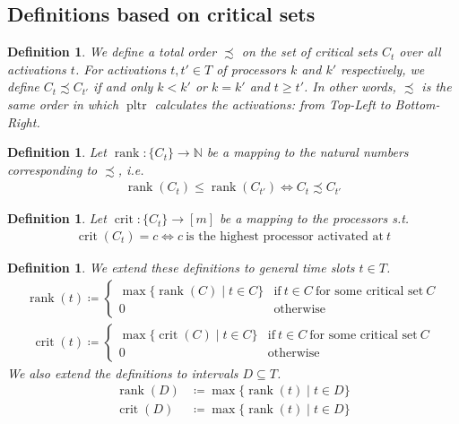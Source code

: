 \documentclass[a4paper]{article}
\DeclareMathOperator{\pltr}{pltr}
\DeclareMathOperator{\rank}{rank}
\DeclareMathOperator{\crit}{crit}
\newtheorem{definition}[theorem]{Definition}
\begin{document}
\subsection{Definitions based on critical sets}
\begin{definition}
  We define a total order $\precsim$ on the set of critical sets $C_t$ over all activations $t$.
  For activations $t, t' \in T$ of processors $k$ and $k'$ respectively, we define $C_t \precsim C_{t'}$ if and only $k < k'$ or $k = k'$ and $t \geq t'$.
  In other words, $\precsim$ is the same order in which $\pltr$ calculates the activations: from Top-Left to Bottom-Right.
\end{definition}
\begin{definition}
  Let $\rank: \{C_t\} \rightarrow \mathbb{N}$ be a mapping to the natural numbers corresponding to $\precsim$, i.e.
  \begin{align}
    \rank(C_t) \leq \rank(C_{t'})
    \Leftrightarrow
    C_t \precsim C_{t'}
  \end{align}
\end{definition}
\begin{definition}
  Let $\crit: \{C_t\} \rightarrow [m]$ be a mapping to the processors s.t.
  \begin{align}
    \crit(C_t) = c
    \Leftrightarrow
    c~\text{is the highest processor activated at}~t
  \end{align}
\end{definition}
\begin{definition}
  We extend these definitions to general time slots $t \in T$.
  \begin{align}
    \rank(t) \coloneqq
    \begin{cases}
      \max \{\rank(C) \mid t \in C \}
      & \text{if}~t \in C~\text{for some critical set}~C
      \\0
      & \text{otherwise}
    \end{cases}
  \end{align}
  \begin{align}
    \crit(t) \coloneqq
    \begin{cases}
      \max \{\crit(C) \mid t \in C \}
      & \text{if}~t \in C~\text{for some critical set}~C
      \\0
      & \text{otherwise}
    \end{cases}
  \end{align}
  We also extend the definitions to intervals $D \subseteq T$.
  \begin{align}
    \rank(D) &\coloneqq \max \{ \rank(t) \mid t \in D \}
    \\ \crit(D) &\coloneqq \max \{ \rank(t) \mid t \in D \}
  \end{align}
\end{definition}
\end{document}
